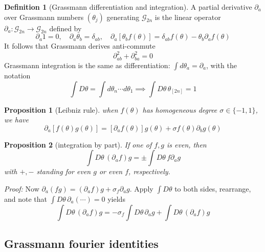 \documentclass[
]{book}
\newtheorem{proposition}{Proposition}[chapter]
\theoremstyle{definition}
\newtheorem{definition}{Definition}[chapter]
\theoremstyle{definition}
\theoremstyle{definition}
\theoremstyle{definition}
\theoremstyle{remark}
\begin{document}
\begin{definition}[Grassmann differentiation and integration]
\protect\hypertarget{def:grassmannDiff}{}\label{def:grassmannDiff}A partial derivative \(\partial_{a}\) over Grassmann numbers \((\theta_j)\) generating \(\mathcal G_{2n}\)
is the linear operator \(\partial_{a}:\mathcal G_{2n}\to \mathcal G_{2n}\) defined by
\[ 
    \partial_{a} 1 = 0, \quad \partial_{a} \theta_b = \delta_{ab}, \quad 
    \partial_{a} [\theta_b f(\theta)] = \delta_{ab}f(\theta) - \theta_b\partial_{a} f(\theta)
\]
It follows that Grassmann derives anti-commute
\[ 
    \partial_{ab}^2 + \partial_{ba}^2 = 0
\]
Grassmann integration is the same as differentiation: \(\int d\theta_a = \partial_{a}\), with
the notation
\[ 
    \int D\theta = \int d\theta_n\cdots d\theta_1\implies \int D\theta\, \theta_{[2n]} = 1
\]
\end{definition}

\begin{proposition}[Leibniz rule]
\protect\hypertarget{prp:leibniz}{}\label{prp:leibniz}when \(f(\theta)\) has \emph{homogeneous degree} \(\sigma \in \{-1, 1\}\), we have
\[ 
    \partial_{a} [f(\theta)g(\theta)] = [\partial_{a} f(\theta)]g(\theta) + \sigma f(\theta) \partial_{b} g(\theta)
\]
\end{proposition}

\begin{proposition}[integration by part]
\protect\hypertarget{prp:integrationByPart}{}\label{prp:integrationByPart}If one of \(f, g\) is even, then
\[ 
    \int D\theta\, (\partial_{a} f)g = \pm \int D\theta\, f\partial_{a} g
\]
with \(+, -\) standing for even \(g\) or even \(f\), respectively.
\end{proposition}

\emph{Proof:} Now \(\partial_{a} (fg) = (\partial_{a} f)g + \sigma_f \partial_{a} g\). Apply \(\int D\theta\)
to both sides, rearrange, and note that \(\int D\theta \, \partial_{a}(\cdots) = 0\) yields
\[ 
    \int D\theta\, (\partial_{a} f)g = -\sigma_f \int D\theta\, \partial_{a} g + \int D\theta\, (\partial_{a} f)g 
\]

\subsection{Grassmann fourier identities}\label{grassmann-fourier-identities}
\end{document}
